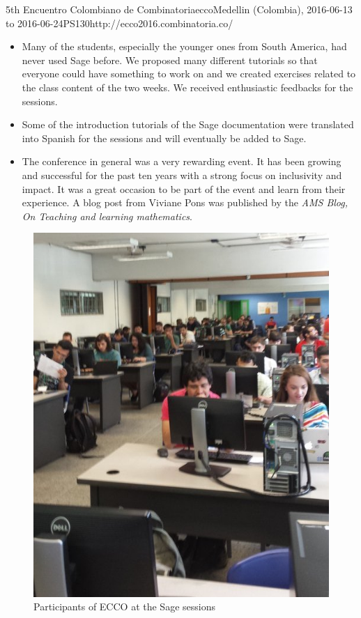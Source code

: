 \begin{event}{5th Encuentro Colombiano de Combinatoria}{ecco}{Medellin (Colombia), 2016-06-13 to 2016-06-24}{PS}{130}{http://ecco2016.combinatoria.co/}
\begin{itemize}
\item Many of the students, especially the younger ones from South America, had never used
Sage before. We proposed many different tutorials so that everyone could have something to
work on and we created exercises related to the class content of the two weeks. We received
 enthusiastic feedbacks for the sessions.

\item Some of the introduction tutorials of the Sage documentation were translated into 
Spanish for the sessions and will eventually be added to Sage.

\item The conference in general was a very rewarding event. It has been growing and successful
for the past ten years with a strong focus on inclusivity and impact. It was a great occasion
to be part of the event and learn from their experience. A blog post from Viviane Pons was
published by the \emph{AMS Blog, On Teaching and learning mathematics}\cite{16PonsECCO}.
\end{itemize}



\begin{figure}[ht]
\caption*{Participants of ECCO at the Sage sessions}
\includegraphics[scale=0.5]{pictures/ECCO-1.jpg}


\end{figure}
\end{event}

